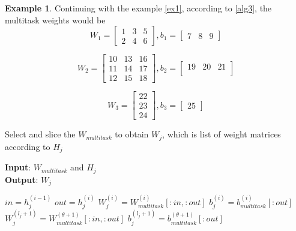 \documentclass[conference]{IEEEtran}
\theoremstyle{definition}
\newtheorem{example}{Example}[section]
\begin{document}
  \begin{example}
    Continuing with the example \ref{ex1}, according to \ref{alg3}, the multitask weights would be
    \begin{equation}
      W_1=
      \begin{bmatrix}
        1& 3& 5\\
        2& 4& 6
      \end{bmatrix},
      b_1=
      \begin{bmatrix}
        7& 8& 9
      \end{bmatrix}
    \end{equation}

    \begin{equation}
      W_2=
      \begin{bmatrix}
        10& 13& 16\\
        11& 14& 17\\
        12& 15& 18
      \end{bmatrix},
      b_2=
      \begin{bmatrix}
        19& 20& 21\\
      \end{bmatrix}
    \end{equation}

    \begin{equation}
      W_3=
      \begin{bmatrix}
        22\\
        23\\
        24
      \end{bmatrix},
      b_3=
      \begin{bmatrix}
        25
      \end{bmatrix}
    \end{equation}
    \label{ex2}
  \end{example}

  \begin{algorithm}
  \caption{Select and slice the $W_{multitask}$ to obtain $W_{j}$, which is list of weight matrices according to $H_{j}$}
  \textbf{Input}: $W_{multitask}$ and $H_j$\\
  \textbf{Output}: $W_j$
  \begin{algorithmic}[1]
      \State $in = h_j^{(i-1)}$
      \State $out = h_j^{(i)}$
      \State $W_j^{(i)} = W_{multitask}^{(i)}[:in, :out]$ 
      \State $b_j^{(i)} = b_{multitask}^{(i)}[:out]$
    \EndFor
    \State $W_j^{(l_j + 1)} = W_{multitask}^{(\theta+1)}[:in, :out]$ 
    \State $b_j^{(l_j + 1)} = b_{multitask}^{(\theta+1)}[:out]$
  \end{algorithmic}
  \label{alg4}
  \end{algorithm}
\end{document}
